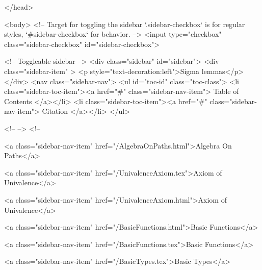   
</head>




  <body>
    <!-- Target for toggling the sidebar `.sidebar-checkbox` is for regular
     styles, `#sidebar-checkbox` for behavior. -->
<input type="checkbox" class="sidebar-checkbox" id="sidebar-checkbox">

<!-- Toggleable sidebar -->
<div class="sidebar" id="sidebar">
  <div class="sidebar-item" >
    <p style="text-decoration:left">Sigma lemmas</p>
  </div>
  <nav class="sidebar-nav">
    <ul id="toc-id" class="toc-class">
  <li class="sidebar-toc-item"><a href="#" class="sidebar-nav-item"> Table of Contents </a></li>
  <li class="sidebar-toc-item"><a href="#" class="sidebar-nav-item"> Citation </a></li>
</ul>


    <!--  -->
    <!-- 
      
    
      
    
      
    
      
        
      
    
      
        
          <a class="sidebar-nav-item" href="/AlgebraOnPaths.html">Algebra On Paths</a>
        
      
    
      
        
          <a class="sidebar-nav-item" href="/UnivalenceAxiom.tex">Axiom of Univalence</a>
        
      
    
      
        
          <a class="sidebar-nav-item" href="/UnivalenceAxiom.html">Axiom of Univalence</a>
        
      
    
      
        
          <a class="sidebar-nav-item" href="/BasicFunctions.html">Basic Functions</a>
        
      
    
      
        
          <a class="sidebar-nav-item" href="/BasicFunctions.tex">Basic Functions</a>
        
      
    
      
        
          <a class="sidebar-nav-item" href="/BasicTypes.tex">Basic Types</a>
        
      
    
      
        
